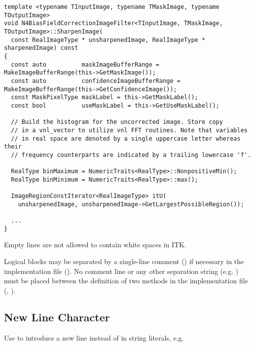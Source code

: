 \small
\begin{verbatim}
template <typename TInputImage, typename TMaskImage, typename TOutputImage>
void N4BiasFieldCorrectionImageFilter<TInputImage, TMaskImage, TOutputImage>::SharpenImage(
  const RealImageType * unsharpenedImage, RealImageType * sharpenedImage) const
{
  const auto          maskImageBufferRange = MakeImageBufferRange(this->GetMaskImage());
  const auto          confidenceImageBufferRange = MakeImageBufferRange(this->GetConfidenceImage());
  const MaskPixelType maskLabel = this->GetMaskLabel();
  const bool          useMaskLabel = this->GetUseMaskLabel();

  // Build the histogram for the uncorrected image. Store copy
  // in a vnl_vector to utilize vnl FFT routines. Note that variables
  // in real space are denoted by a single uppercase letter whereas their
  // frequency counterparts are indicated by a trailing lowercase 'f'.

  RealType binMaximum = NumericTraits<RealType>::NonpositiveMin();
  RealType binMinimum = NumericTraits<RealType>::max();

  ImageRegionConstIterator<RealImageType> itU(
    unsharpenedImage, unsharpenedImage->GetLargestPossibleRegion());

  ...
}
\end{verbatim}
\normalsize

Empty lines are not allowed to contain white spaces in ITK.

Logical blocks may be separated by a single-line comment () if
necessary in the implementation file (). No comment line or any other
separation string (e.g. \code{/***********************/}) must be placed between
the definition of two methods in the implementation file (,
).


\subsection{New Line Character}
\label{subsec:NewLineCharacter}

Use  to introduce a new line instead of  in string
literals, e.g.

